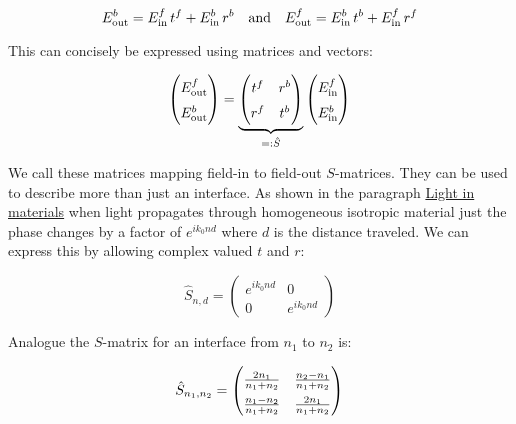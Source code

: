 \begin{equation}
    E^b_\s{out} = E^f_\s{in} \, t^f + E^b_\s{in} \, r^b
    \qq{and}
    E^f_\s{out} = E^b_\s{in} \, t^b + E^f_\s{in} \, r^f
\end{equation}

This can concisely be expressed using matrices and vectors:

\begin{equation}
\begin{pmatrix}
    E^f_\s{out} \\
    E^b_\s{out}
\end{pmatrix} =
\underbrace{
\begin{pmatrix}
    t^f & r^b \\
    r^f & t^b
\end{pmatrix}
}_{
 =: \hat{S}
}
\begin{pmatrix}
    E^f_\s{in} \\
    E^b_\s{in}
\end{pmatrix}
\end{equation}

We call these matrices mapping field-in to field-out $S$-matrices. They can be used to describe more than just an interface. As shown in the paragraph \hyperref[par:light_in_materials]{Light in materials} when light propagates through homogeneous isotropic material just the phase changes by a factor of $e^{i k_0 n d}$ where $d$ is the distance traveled. We can express this by allowing complex valued $t$ and $r$:

\begin{equation}
    \hat S_{n, d} =
    \begin{pmatrix}
        e^{i k_0 n d} & 0 \\
        0 & e^{i k_0 n d}
    \end{pmatrix}
\end{equation}

Analogue the $S$-matrix for an interface from $n_1$ to $n_2$ is:

\begin{equation}
    \hat S_{n_1, n_2} =
    \begingroup
    \renewcommand*{\arraystretch}{1.5}
        \begin{pmatrix}
            \frac{2 n_1}{n_1 + n_2} & \frac{n_2 - n_1}{n_1 + n_2} \\
            \frac{n_1 - n_2}{n_1 + n_2} & \frac{2 n_1}{n_1 + n_2}
        \end{pmatrix}
    \endgroup
\end{equation}


